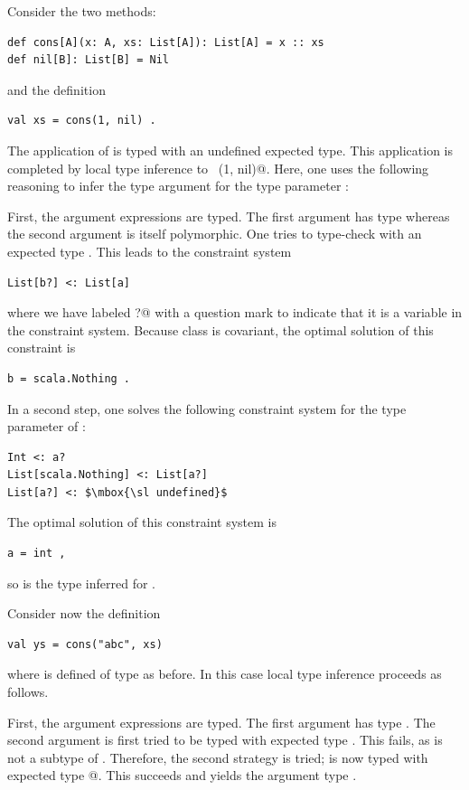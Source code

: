 \example Consider the two methods:
\begin{lstlisting}
def cons[A](x: A, xs: List[A]): List[A] = x :: xs
def nil[B]: List[B] = Nil
\end{lstlisting}
and the definition
\begin{lstlisting}
val xs = cons(1, nil) .
\end{lstlisting}
The application of  is typed with an undefined expected
type. This application is completed by local type inference to 
~\lstinline@cons[Int](1, nil)@. 
Here, one uses the following
reasoning to infer the type argument \lstinline@int@ for the type
parameter :

First, the argument expressions are typed. The first argument 
has type  whereas the second argument \lstinline@nil@ is
itself polymorphic. One tries to type-check \lstinline@nil@ with an
expected type . This leads to the constraint system
\begin{lstlisting}
List[b?] <: List[a]
\end{lstlisting}
where we have labeled \lstinline@b?@ with a question mark to indicate
that it is a variable in the constraint system.
Because class \lstinline@List@ is covariant, the optimal
solution of this constraint is
\begin{lstlisting}
b = scala.Nothing .
\end{lstlisting}

In a second step, one solves the following constraint system for
the type parameter  of :
\begin{lstlisting}
Int <: a?
List[scala.Nothing] <: List[a?]
List[a?] <: $\mbox{\sl undefined}$
\end{lstlisting}
The optimal solution of this constraint system is
\begin{lstlisting}
a = int ,
\end{lstlisting}
so  is the type inferred for .

\example Consider now the definition  
\begin{lstlisting}
val ys = cons("abc", xs)
\end{lstlisting}
where  is defined of type  as before.
In this case local type inference proceeds as follows.

First, the argument expressions are typed. The first argument
 has type . The second argument  is
first tried to be typed with expected type . This fails,
as  is not a subtype of . Therefore, 
the second strategy is tried;  is now typed with expected type
@. This succeeds and yields the argument type
.

